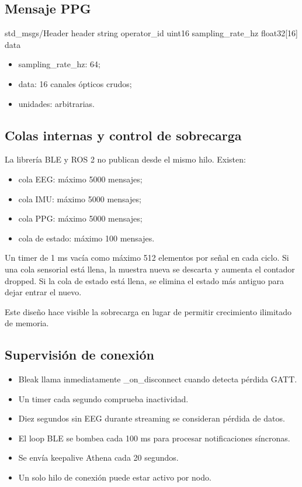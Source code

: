\documentclass[11pt,a4paper]{article}
\begin{document}
\subsection{Mensaje PPG}

\begin{MuseCode}
std_msgs/Header header
string operator_id
uint16 sampling_rate_hz
float32[16] data
\end{MuseCode}

\begin{itemize}
\item {\ttfamily\small sampling\_rate\_hz}: 64;
\item {\ttfamily\small data}: 16 canales ópticos crudos;
\item unidades: arbitrarias.
\end{itemize}

\subsection{Colas internas y control de sobrecarga}

La librería BLE y ROS 2 no publican desde el mismo hilo. Existen:

\begin{itemize}
\item cola EEG: máximo 5000 mensajes;
\item cola IMU: máximo 5000 mensajes;
\item cola PPG: máximo 5000 mensajes;
\item cola de estado: máximo 100 mensajes.
\end{itemize}

Un timer de 1 ms vacía como máximo 512 elementos por señal en cada ciclo. Si una cola sensorial está llena, la muestra nueva se descarta y aumenta el contador {\ttfamily\small dropped}. Si la cola de estado está llena, se elimina el estado más antiguo para dejar entrar el nuevo.

Este diseño hace visible la sobrecarga en lugar de permitir crecimiento ilimitado de memoria.

\subsection{Supervisión de conexión}

\begin{itemize}
\item Bleak llama inmediatamente {\ttfamily\small \_on\_disconnect} cuando detecta pérdida GATT.
\item Un timer cada segundo comprueba inactividad.
\item Diez segundos sin EEG durante streaming se consideran pérdida de datos.
\item El loop BLE se bombea cada 100 ms para procesar notificaciones síncronas.
\item Se envía keepalive Athena cada 20 segundos.
\item Un solo hilo de conexión puede estar activo por nodo.
\end{itemize}
\end{document}
